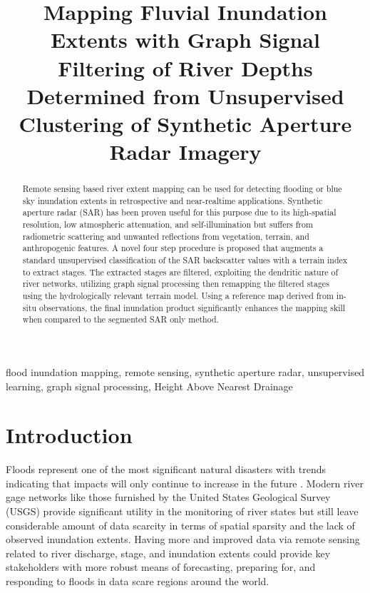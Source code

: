 \documentclass{article}
\title{Mapping Fluvial Inundation Extents with Graph Signal Filtering of River Depths Determined from Unsupervised Clustering of Synthetic Aperture Radar Imagery}
\begin{document}
\topmargin=0mm
%
\maketitle
%
\begin{abstract}
Remote sensing based river extent mapping can be used for detecting flooding or blue sky inundation extents in retrospective and near-realtime applications.
Synthetic aperture radar (SAR) has been proven useful for this purpose due to its high-spatial resolution, low atmospheric attenuation, and self-illumination but suffers from radiometric scattering and unwanted reflections from vegetation, terrain, and anthropogenic features. 
A novel four step procedure is proposed that augments a standard unsupervised classification of the SAR backscatter values with a terrain index to extract stages. 
The extracted stages are filtered, exploiting the dendritic nature of river networks, utilizing graph signal processing then remapping the filtered stages using the hydrologically relevant terrain model. 
Using a reference map derived from in-situ observations, the final inundation product significantly enhances the mapping skill when compared to the segmented SAR only method.
\end{abstract}
%
\begin{keywords}
flood inundation mapping, remote sensing, synthetic aperture radar, unsupervised learning, graph signal processing, Height Above Nearest Drainage
\end{keywords}
%
\section{Introduction}
\label{sec:intro}
%
Floods represent one of the most significant natural disasters \cite{national_weather_service_2020,national_weather_service_2019,national_weather_service_2018,us_department_of_commerce_2020} with trends indicating that impacts will only continue to increase in the future \cite{mallakpour2015changing,downton2005reanalysis,kunkel1999temporal,pielke2000precipitation,corringham2019effect,tabari2020climate,milly2002increasing,wing2018estimates}. 
Modern river gage networks like those furnished by the United States Geological Survey (USGS) provide significant utility in the monitoring of river states but still leave considerable amount of data scarcity in terms of spatial sparsity and the lack of observed inundation extents. 
Having more and improved data via remote sensing related to river discharge, stage, and inundation extents could provide key stakeholders with more robust means of forecasting, preparing for, and responding to floods in data scare regions around the world.
\end{document}
